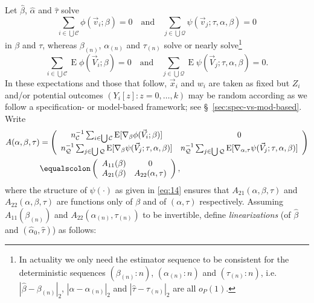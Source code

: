 \documentclass{article}
\newcommand{\eqdef}{\ensuremath{\equalscolon}}
\newcommand{\EE}{\operatorname{E}}
\begin{document}
Let $\hat\beta$, $\hat{\alpha}$ and $\hat\tau$ solve
\[\sum_{i\in \bigcup \mathcal{C}}\phi(\vec{v}_{i}; \beta )
  =0\quad\text{and}\quad
\sum_{j\in \bigcup \mathcal{Q}}\psi(\vec{v}_{j}; \tau,
\alpha, \beta )  =0
  \]
  in $\beta$ and $\tau$, whereas $\beta_{(n)}$, $\alpha_{(n)}$ and $\tau_{(n)}$ solve or nearly solve\footnote{%
In actuality we only need the estimator sequence to be consistent for the deterministic sequences $(\beta_{(n)}:n)$, $(\alpha_{(n)}:n)$ and $(\tau_{(n)}:n)$, i.e. $|\hat\beta - \beta_{(n)}|_{2}$, $|\hat{\alpha} - \alpha_{(n)}|_{2}$ and $|\hat\tau - \tau_{(n)}|_{2}$ are all $o_{P}(1)$.%
}
\[\sum_{i\in \bigcup \mathcal{C}}\EE\phi(\vec{V}_{i}; \beta )
  =0\quad\text{and}\quad
\sum_{j\in \bigcup \mathcal{Q}}\EE\psi(\vec{V}_{j}; \tau,
\alpha, \beta )  =0.
  \]
In these expectations and those that follow, $\vec{x}_{i}$ and $w_{i}$
are taken as fixed but $Z_{i}$ and/or potential outcomes $(Y_{i}[z]:
z=0, \ldots, k)$ may be random according as we follow a specification- or
model-based framework; see \S~\ref{sec:spec-vs-mod-based}.
  Write
\begin{align}
\nonumber
    A(\alpha, \beta, \tau) &= \left(
      \begin{array}{cc}
        n_{\mathcal{C}}^{-1}\sum_{i\in \bigcup
        \mathcal{C}}\EE [\nabla_{\beta}\phi(\vec{V}_{i};
        \beta )]&0\\
        n_{\mathcal{Q}}^{-1}\sum_{j\in \bigcup
        \mathcal{Q}}\EE[ \nabla_{\beta}\psi(\vec{V}_{j};
        \tau, \alpha, \beta )]  & n_{\mathcal{Q}}^{-1}\sum_{j\in \bigcup
        \mathcal{Q}}\EE[ \nabla_{\alpha, \tau}\psi(\vec{V}_{j};
        \tau, \alpha, \beta )]
      \end{array}
                                  \right)\\
    \label{eq:13}
    &\eqdef \left(
      \begin{array}{cc}
        A_{11}(\beta)& 0\\
        A_{21}(\beta) & A_{22}(\alpha, \tau)
      \end{array}
\right),
  \end{align}
where the structure of $\psi(\cdot)$ as given in \eqref{eq:14} ensures
that $A_{21}(\alpha, \beta, \tau)$ and $A_{22}(\alpha, \beta, \tau)$
are functions only of $\beta$ and of $(\alpha, \tau)$
respectively. Assuming $A_{11}(\beta_{(n)})$ and $A_{22}(\alpha_{(n)},
\tau_{(n)})$ to be invertible, define \textit{linearizations} (of
$\hat\beta$ and $(\hat{\alpha}_{0}, \hat\tau)$) as follows:
\end{document}
